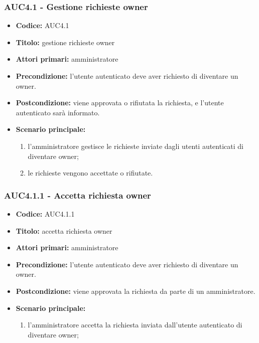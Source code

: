 \documentclass[casi-duso]{subfiles}
\begin{document}
\subsubsection{AUC4.1 - Gestione richieste owner}%
\label{subsub:AUC4.1}
\begin{itemize}
  \item \textbf{Codice:} AUC4.1
  \item \textbf{Titolo:} gestione richieste owner
  \item \textbf{Attori primari:} amministratore
  \item \textbf{Precondizione:} l'utente autenticato deve aver richiesto di diventare un owner.
  \item \textbf{Postcondizione:} viene approvata o rifiutata la richiesta, e l'utente autenticato sarà informato.
  \item \textbf{Scenario principale:} 
  \begin{enumerate}
    \item l'amministratore gestisce le richieste inviate dagli utenti autenticati di diventare owner;
    \item le richieste vengono accettate o rifiutate.
  \end{enumerate}
\end{itemize}

\subsubsection{AUC4.1.1 - Accetta richiesta owner}%
\label{subsub:AUC4.1.1}
\begin{itemize}
  \item \textbf{Codice:} AUC4.1.1
  \item \textbf{Titolo:} accetta richiesta owner
  \item \textbf{Attori primari:} amministratore
  \item \textbf{Precondizione:} l'utente autenticato deve aver richiesto di diventare un owner.
  \item \textbf{Postcondizione:} viene approvata la richiesta da parte di un amministratore.
  \item \textbf{Scenario principale:}
  \begin{enumerate}
    \item l'amministratore accetta la richiesta inviata dall'utente autenticato di diventare owner;
  \end{enumerate}
\end{itemize}
\end{document}
